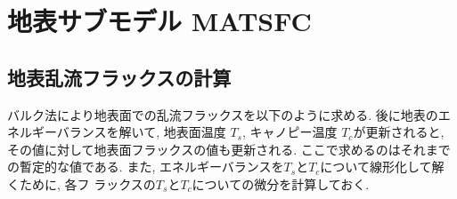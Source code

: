 \section{地表サブモデル MATSFC}

\subsection{地表乱流フラックスの計算}

バルク法により地表面での乱流フラックスを以下のように求める. 
後に地表のエネルギーバランスを解いて, 地表面温度 $T_s$, キャノピー温度
$T_c$が更新されると, その値に対して地表面フラックスの値も更新される. 
ここで求めるのはそれまでの暫定的な値である. 
また, エネルギーバランスを$T_s$と$T_c$について線形化して解くために, 各フ
ラックスの$T_s$と$T_c$についての微分を計算しておく. 


